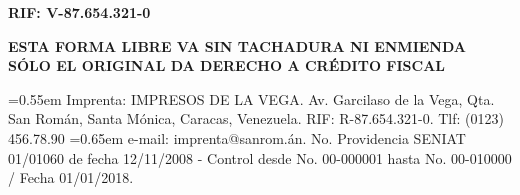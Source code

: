 \documentclass[12pt]{article}
\begin{document}
 \begin{minipage}[b][\textheight]{\textwidth}
  \baselineskip13pt
  \parskip0pt
  \hspace*{\fill}%
  \hspace*{\fill}\par
  \hspace*{\fill}%
  \parbox{0.63\textwidth}{%
   \color{gray}\footnotesize\bfseries
   \hfill
   RIF: V-87.654.321-0}%
  \hspace*{\fill}\par
  \vfill\mbox{}%
  \fontsize{6}{8}\selectfont
  \hspace*{0.5cm}%
  \parskip2pt
  {\bfseries ESTA FORMA LIBRE VA SIN TACHADURA NI ENMIENDA \hfill SÓLO EL ORIGINAL DA DERECHO A CRÉDITO FISCAL}
  \hspace*{0.5cm}\par
  \font=0.55em
  Imprenta: \hfill IMPRESOS DE LA VEGA. Av. Garcilaso de la Vega, Qta. San Román, Santa Mónica, Caracas, Venezuela. RIF: R-87.654.321-0. Tlf: (0123) 456.78.90\newline
  \font=0.65em
  e-mail: \hfill imprenta@sanrom.án. No. Providencia SENIAT 01/01060 de fecha 12/11/2008 - Control desde No. 00-000001 hasta No. 00-010000 / Fecha 01/01/2018.\par
 \end{minipage}
\end{document}
